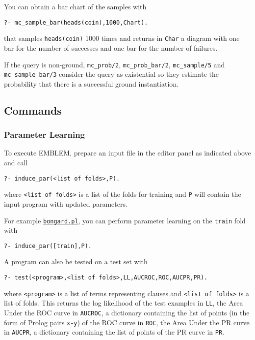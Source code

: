 \documentclass[a4paper,10pt]{article}
\begin{document}
You can obtain a bar chart of the samples with
\begin{verbatim}
?- mc_sample_bar(heads(coin),1000,Chart).
\end{verbatim}
that samples \verb|heads(coin)| 1000 times and returns in \verb|Char| a diagram with one bar for the number of successes and 
one bar for the number of failures.

If the query is non-ground, \verb|mc_prob/2|, \verb|mc_prob_bar/2|, \verb|mc_sample/5| and \verb|mc_sample_bar/3|  consider the query as existential
so they estimate the probability that there is a successful ground instantiation.





\subsection{Commands}
\subsubsection{Parameter Learning}
To execute EMBLEM, prepare an input file in the editor panel as indicated above 
and call
\begin{verbatim}
?- induce_par(<list of folds>,P).
\end{verbatim}
where \verb|<list of folds>| is a list of the folds for training and
\verb|P| will contain the input program with updated parameters.

For example \href{http://cplint.lamping.unife.it/example/bongard.pl}{\texttt{bongard.pl}}, you can 
perform parameter learning on the \verb|train| fold with 
\begin{verbatim}
?- induce_par([train],P).
\end{verbatim}
A program can also be tested on a test set with
\begin{verbatim}
?- test(<program>,<list of folds>,LL,AUCROC,ROC,AUCPR,PR).
\end{verbatim}
where \verb|<program>| is a list of terms representing clauses and
\verb|<list of folds>| is a list of folds.
This returns the log likelihood of the test examples in \verb|LL|, the Area Under the ROC curve in \verb|AUCROC|, a dictionary containing the list of points (in the form of Prolog pairs \verb|x-y|) of the ROC curve in \verb|ROC|,
the Area Under the PR curve in \verb|AUCPR|, a dictionary containing the list of points of the PR curve in \verb|PR|.
\end{document}
